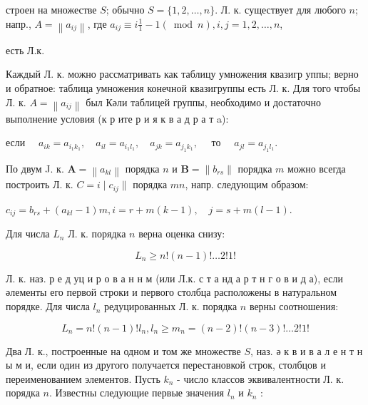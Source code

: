 \documentclass[10pt]{article}
\begin{document}
строен на множестве $S$; обычно $S=\{1,2, \ldots, n\}$. Л. к. существует для любого $n$; напр., $A=\left\|a_{i j}\right\|$, где $a_{i j} \equiv i \frac{1}{1}-1(\bmod n), i, j=1,2, \ldots, n$,



есть Л.к.



Каждый Л. к. можно рассматривать как таблицу умножения квазигр уппы; верно и обратное: таблица умножения конечной квазигруппы есть Л. к. Для того чтобы Л. к. $A=\left\|a_{i j}\right\|$ был Кәли таблицей группы, необходимо и достаточно выполнение условия (к р ите р и я к в а д р а т a):



если $\quad a_{i k}=a_{i_{1} k_{1}}, \quad a_{i l}=a_{i_{1} l_{1}}, \quad a_{j k}=a_{j_{1} k_{1}}, \quad$ то $\quad a_{j l}=a_{j_{1} l_{1}}$.



По двум J. к. $\boldsymbol{A}=\left\|a_{k l}\right\|$ порядка $n$ и $\boldsymbol{B}=\left\|b_{r s}\right\|$ порядка $m$ можно всегда построить Л. к. $C=i \mid c_{i j} \|$ порядка $m n$, напр. следующим образом:



$c_{i j}=b_{r s}+\left(a_{k l}-1\right) m, i=r+m(k-1), \quad j=s+m(l-1)$.



Для числа $L_{n}$ Л. к. порядка $n$ верна оценка снизу:



\[

L_{n} \geqslant n !(n-1) ! \ldots 2 ! 1 !

\]



Л. к. наз. р е д уц и р о в а н н м (или Л.к. с т а нд а р т н г о в и д а), если әлементы его первой строки и первого столбца расположены в натуральном порядке. Для числа $l_{n}$ редуцированных Л. к. порядка $n$ верны соотношения:



\[

L_{n}=n !(n-1) ! l_{n}, l_{n} \geqslant m_{n}=(n-2) !(n-3) ! \ldots 2 ! 1 !

\]



Два Л. к., построенные на одном и том же множестве $S$, наз. ә к в и в а л е н т н ы м и, если один из другого получается перестановкой строк, столбцов и переименованием элементов. Пусть $k_{n}$ - число классов эквивалентности Л. к. порядка $n$. Известны следующие первые значения $l_{n}$ и $k_{n}$ :
\end{document}
